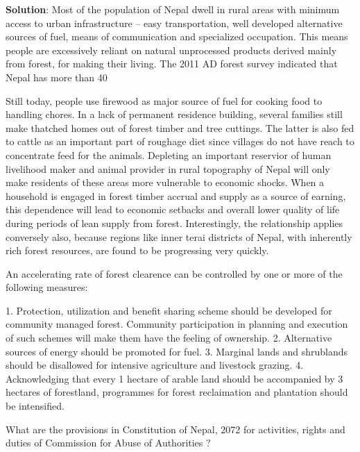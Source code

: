 \documentclass[
  openany]{book}
\newcommand{\question}{\item}
\newenvironment{solution}{ {\bfseries Solution}:}{}
\begin{document}
\begin{questions}
\begin{solution}
Most of the population of Nepal dwell in rural areas with minimum access to urban infrastructure -- easy transportation, well developed alternative sources of fuel, means of communication and specialized occupation. This means people are excessively reliant on natural unprocessed products derived mainly from forest, for making their living. The 2011 AD forest survey indicated that Nepal has more than 40%

Still today, people use firewood as major source of fuel for cooking food to handling chores. In a lack of permanent residence building, several families still make thatched homes out of forest timber and tree cuttings. The latter is also fed to cattle as an important part of roughage diet since villages do not have reach to concentrate feed for the animals. Depleting an important reservior of human livelihood maker and animal provider in rural topography of Nepal will only make residents of these areas more vulnerable to economic shocks. When a household is engaged in forest timber accrual and supply as a source of earning, this dependence will lead to economic setbacks and overall lower quality of life during periods of lean supply from forest. Interestingly, the relationship applies conversely also, because regions like inner terai districts of Nepal, with inherently rich forest resources, are found to be progressing very quickly.

An accelerating rate of forest clearence can be controlled by one or more of the following measures:

1. Protection, utilization and benefit sharing scheme should be developed for community managed forest. Community participation in planning and execution of such schemes will make them have the feeling of ownership.
2. Alternative sources of energy should be promoted for fuel.
3. Marginal lands and shrublands should be disallowed for intensive agriculture and livestock grazing.
4. Acknowledging that every 1 hectare of arable land should be accompanied by 3 hectares of forestland, programmes for forest reclaimation and plantation should be intensified.

\end{solution}

\question What are the provisions in Constitution of Nepal, 2072 for activities, rights and duties of Commission for Abuse of Authorities ?


\end{questions}
\end{document}
